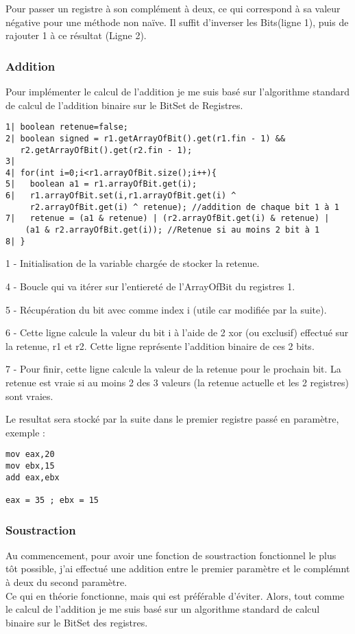 \documentclass{article}
\begin{document}
Pour passer un registre à son complément à deux, ce qui correspond à sa valeur négative pour une méthode non naïve. Il suffit d'inverser les Bits(ligne 1), puis de rajouter 1 à ce résultat (Ligne 2).

\subsubsection{Addition}
Pour implémenter le calcul de l'addition je me suis basé sur l'algorithme standard de calcul de l'addition binaire sur le BitSet de Registres.

\begin{verbatim}
1| boolean retenue=false;
2| boolean signed = r1.getArrayOfBit().get(r1.fin - 1) &&
   r2.getArrayOfBit().get(r2.fin - 1);
3|
4| for(int i=0;i<r1.arrayOfBit.size();i++){
5|   boolean a1 = r1.arrayOfBit.get(i);
6|   r1.arrayOfBit.set(i,r1.arrayOfBit.get(i) ^
     r2.arrayOfBit.get(i) ^ retenue); //addition de chaque bit 1 à 1
7|   retenue = (a1 & retenue) | (r2.arrayOfBit.get(i) & retenue) |
    (a1 & r2.arrayOfBit.get(i)); //Retenue si au moins 2 bit à 1
8| }
\end{verbatim}

1 - Initialisation de la variable chargée de stocker la retenue.

4 - Boucle qui va itérer sur l'entiereté de l'ArrayOfBit du registres 1.

5 - Récupération du bit avec comme index i (utile car modifiée par la suite).

6 - Cette ligne calcule la valeur du bit i à l'aide de 2 xor (ou exclusif) effectué sur la retenue, r1 et r2.
Cette ligne représente l'addition binaire de ces 2 bits.

7 - Pour finir, cette ligne calcule la valeur de la retenue pour le prochain bit.
La retenue est vraie si au moins 2 des 3 valeurs (la retenue actuelle et les 2 registres) sont vraies.

Le resultat sera stocké par la suite dans le premier registre passé en paramètre, exemple :
\begin{verbatim}
mov eax,20
mov ebx,15
add eax,ebx

eax = 35 ; ebx = 15
\end{verbatim}

\subsubsection{Soustraction}
Au commencement, pour avoir une fonction de soustraction fonctionnel le plus tôt possible, j'ai effectué une addition entre le premier paramètre et le complémnt à deux du second paramètre.\\
Ce qui en théorie fonctionne, mais qui est préférable d'éviter.
Alors, tout comme le calcul de l'addition je me suis basé sur un algorithme standard de calcul binaire sur le BitSet des registres.
\end{document}
